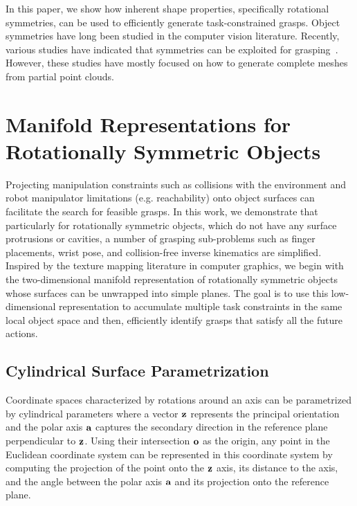\documentclass{aamas2015}
\begin{document}
In this paper, we show how inherent shape properties, specifically
rotational symmetries, can be used to efficiently generate 
task-constrained grasps. Object symmetries have long
been studied in the computer vision literature.
Recently, various studies have indicated that symmetries 
can be exploited for grasping~\cite{kroemerHumanoids2012, bohg2011mind}. However, 
these studies have mostly focused on how to generate complete 
meshes from partial point clouds.

\newpage
\section{Manifold Representations for \\Rotationally Symmetric Objects}

Projecting manipulation constraints such as collisions with the environment and robot
manipulator limitations (e.g. reachability) onto object surfaces can facilitate the search
for feasible grasps. In this work, we demonstrate that particularly for rotationally
symmetric objects, which do not have any surface protrusions or cavities, a number of grasping sub-problems
such as finger placements, wrist pose, and collision-free inverse kinematics are simplified. 
Inspired by the texture mapping literature in computer graphics, we begin with the two-dimensional manifold
representation of rotationally symmetric objects whose surfaces can be unwrapped
into simple planes. The goal is to use this low-dimensional representation to accumulate
multiple task constraints in the same local object space and then, efficiently identify 
grasps that satisfy all the future actions. 

\subsection{Cylindrical Surface Parametrization}

Coordinate spaces characterized by rotations around an axis can be parametrized by cylindrical
parameters where a vector $\textbf{z}$ represents the principal orientation and the polar axis
$\textbf{a}$ captures the secondary direction in the reference plane perpendicular to $\textbf{z}$. 
Using their intersection $\textbf{o}$ as the origin, any point in the Euclidean coordinate system can
be represented in this coordinate system by computing the projection of the point onto the
$\textbf{z}$ axis, its distance to the axis, and the angle between the polar axis $\textbf{a}$ and its
projection onto the reference plane. 
\end{document}
